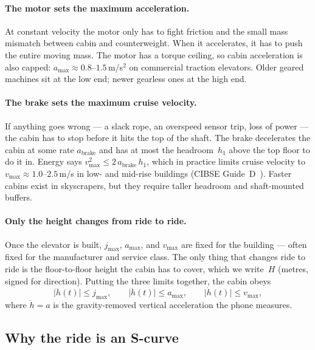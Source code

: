 \documentclass[manuscript,review,screen]{acmart}
\begin{document}
\paragraph{The motor sets the maximum acceleration.}
At constant velocity the motor only has to fight friction and the
small mass mismatch between cabin and counterweight.  When it
accelerates, it has to push the entire moving mass.  The motor has
a torque ceiling, so cabin acceleration is also capped:
$a_{\max}\!\approx\!0.8$--$1.5$\,m/s$^2$ on commercial traction
elevators.  Older geared machines sit at the low end; newer
gearless ones at the high end.

\paragraph{The brake sets the maximum cruise velocity.}
If anything goes wrong --- a slack rope, an overspeed sensor trip,
loss of power --- the cabin has to stop before it hits the top of
the shaft.  The brake decelerates the cabin at some rate
$a_{\text{brake}}$ and has at most the headroom~$h_1$ above the top
floor to do it in.  Energy says $v_{\max}^{2}\le 2\,a_{\text{brake}}\,h_1$,
which in practice limits cruise velocity to
$v_{\max}\!\approx\!1.0$--$2.5$\,m/s in low- and mid-rise
buildings (CIBSE Guide~D~\cite{cibseguidd2020}).  Faster cabins
exist in skyscrapers, but they require taller headroom and
shaft-mounted buffers.

\paragraph{Only the height changes from ride to ride.}
Once the elevator is built, $j_{\max}$, $a_{\max}$, and $v_{\max}$
are fixed for the building --- often fixed for the manufacturer
and service class.  The only thing that changes ride to ride is
the floor-to-floor height the cabin has to cover, which we
write~$H$ (metres, signed for direction).  Putting the three
limits together, the cabin obeys
\begin{equation}
  \big|\dddot h(t)\big|\le j_{\max},\qquad
  \big|\ddot  h(t)\big|\le a_{\max},\qquad
  \big|\dot   h(t)\big|\le v_{\max},
  \label{eq:elevator-bounds}
\end{equation}
where $\ddot h\!=\!a$ is the gravity-removed vertical acceleration
the phone measures.

\subsection{Why the ride is an S-curve}
\label{sec:bg-scurve}
\end{document}
